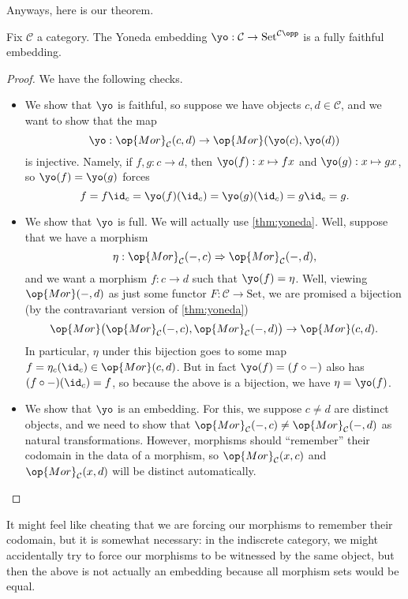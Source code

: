 Anyways, here is our theorem.
\begin{theorem} \label{thm:yonedaembedding}
	Fix $\mathcal C$ a category. The Yoneda embedding $\yo:\mathcal C\to\mathrm{Set}^{\mathcal C\opp}$ is a fully faithful embedding.
\end{theorem}
\begin{proof}
	We have the following checks.
	\begin{itemize}
		\item We show that $\yo$ is faithful, so suppose we have objects $c,d\in\mathcal C$, and we want to show that the map
		\[\yo:\op{Mor}_\mathcal C(c,d)\to\op{Mor}(\yo(c),\yo(d))\]
		is injective. Namely, if $f,g:c\to d$, then $\yo(f):x\mapsto fx$ and $\yo(g):x\mapsto gx$, so $\yo(f)=\yo(g)$ forces
		\[f=f\id_c=\yo(f)(\id_c)=\yo(g)(\id_c)=g\id_c=g.\]
		\item We show that $\yo$ is full. We will actually use \autoref{thm:yoneda}. Well, suppose that we have a morphism
		\[\eta:\op{Mor}_\mathcal C(-,c)\Rightarrow\op{Mor}_\mathcal C(-,d),\]
		and we want a morphism $f:c\to d$ such that $\yo(f)=\eta$. Well, viewing $\op{Mor}(-,d)$ as just some functor $F:\mathcal C\to\mathrm{Set}$, we are promised a bijection (by the contravariant version of \autoref{thm:yoneda})
		\[\op{Mor}\big(\op{Mor}_\mathcal C(-,c),\op{Mor}_\mathcal C(-,d)\big)\to\op{Mor}(c,d).\]
		In particular, $\eta$ under this bijection goes to some map $f=\eta_c(\id_c)\in\op{Mor}(c,d)$. But in fact $\yo(f)=(f\circ-)$ also has $(f\circ-)(\id_c)=f$, so because the above is a bijection, we have $\eta=\yo(f)$.
		\item We show that $\yo$ is an embedding. For this, we suppose $c\ne d$ are distinct objects, and we need to show that $\op{Mor}_\mathcal C(-,c)\ne\op{Mor}_\mathcal C(-,d)$ as natural transformations. However, morphisms should ``remember'' their codomain in the data of a morphism, so $\op{Mor}_\mathcal C(x,c)$ and $\op{Mor}_\mathcal C(x,d)$ will be distinct automatically.
		\qedhere
	\end{itemize}
\end{proof}
It might feel like cheating that we are forcing our morphisms to remember their codomain, but it is somewhat necessary: in the indiscrete category, we might accidentally try to force our morphisms to be witnessed by the same object, but then the above is not actually an embedding because all morphism sets would be equal.

